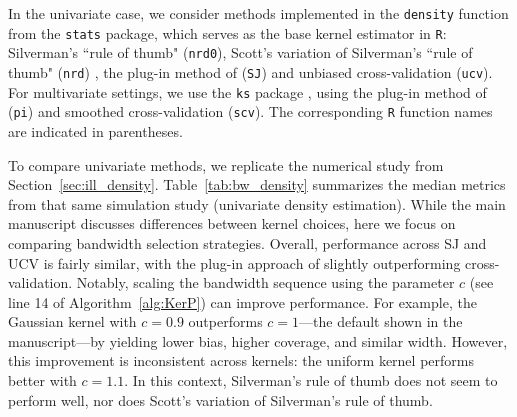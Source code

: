 \documentclass{article}
\theoremstyle{definition}
\renewcommand{\&}{and}
\begin{document}
In the univariate case, we consider methods implemented in the \texttt{density} function from the \texttt{stats} package, which serves as the base kernel estimator in \texttt{R}: Silverman's ``rule of thumb" (\texttt{nrd0})\citep{silverman2018density}, Scott's variation of Silverman's ``rule of thumb" (\texttt{nrd}) \cite{scott2015multivariate},
the plug-in method of \cite{sheather1991reliable} (\texttt{SJ}) and unbiased cross-validation (\texttt{ucv}). For multivariate settings, we use the \texttt{ks} package \citep{duong2024package}, using the plug-in method of \cite{wand1994multivariate} (\texttt{pi}) and smoothed cross-validation (\texttt{scv}). The corresponding \texttt{R} function names are indicated in parentheses.

To compare univariate methods, we replicate the numerical study from Section~\ref{sec:ill_density}. Table~\ref{tab:bw_density} summarizes the median metrics from that same simulation study (univariate density estimation). While the main manuscript discusses differences between kernel choices, here we focus on comparing bandwidth selection strategies. Overall, performance across SJ and UCV is fairly similar, with the plug-in approach of \cite{sheather1991reliable} slightly outperforming cross-validation. Notably, scaling the bandwidth sequence using the parameter $c$ (see line 14 of Algorithm~\ref{alg:KerP}) can improve performance. For example, the Gaussian kernel with $c=0.9$ outperforms $c=1$—the default shown in the manuscript—by yielding lower bias, higher coverage, and similar width. However, this improvement is inconsistent across kernels: the uniform kernel performs better with $c=1.1$. In this context, Silverman's rule of thumb does not seem to perform well, nor does Scott's variation of Silverman's rule of thumb. 
\end{document}
